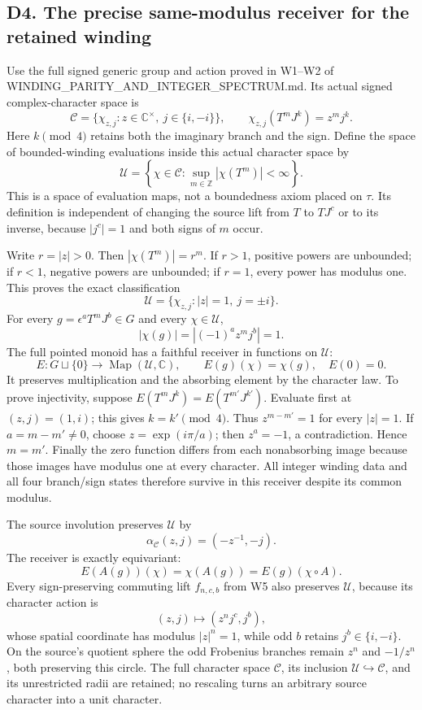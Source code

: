 \documentclass[
  11pt,
]{article}
\begin{document}
\subsection{D4. The precise same-modulus receiver for the retained
winding}\label{d4.-the-precise-same-modulus-receiver-for-the-retained-winding}

Use the full signed generic group and action proved in W1--W2 of
WINDING\_PARITY\_AND\_INTEGER\_SPECTRUM.md. Its actual signed
complex-character space is \[
\mathcal C=\{\chi_{z,j}:z\in\mathbb C^\times,\ j\in\{i,-i\}\},
\qquad
\chi_{z,j}(T^mJ^k)=z^m j^k.
\] Here \(k\pmod4\) retains both the imaginary branch and the sign.
Define the space of bounded-winding evaluations inside this actual
character space by \[
\mathcal U=\left\{\chi\in\mathcal C:\sup_{m\in\mathbb Z}|\chi(T^m)|<\infty\right\}.
\] This is a space of evaluation maps, not a boundedness axiom placed on
\(\tau\). Its definition is independent of changing the source lift from
\(T\) to \(TJ^c\) or to its inverse, because \(|j^c|=1\) and both signs
of \(m\) occur.

Write \(r=|z|>0\). Then \(|\chi(T^m)|=r^m\). If \(r>1\), positive powers
are unbounded; if \(r<1\), negative powers are unbounded; if \(r=1\),
every power has modulus one. This proves the exact classification \[
\boxed{\mathcal U=\{\chi_{z,j}:|z|=1,\ j=\pm i\}.}
\] For every \(g=\epsilon^aT^mJ^b\in G\) and every
\(\chi\in\mathcal U\), \[
|\chi(g)|=|(-1)^a z^m j^b|=1.
\] The full pointed monoid has a faithful receiver in functions on
\(\mathcal U\): \[
E:G\sqcup\{0\}\longrightarrow\operatorname{Map}(\mathcal U,\mathbb C),
\qquad E(g)(\chi)=\chi(g),\quad E(0)=0.
\] It preserves multiplication and the absorbing element by the
character law. To prove injectivity, suppose
\(E(T^mJ^k)=E(T^{m'}J^{k'})\). Evaluate first at \((z,j)=(1,i)\); this
gives \(k=k'\pmod4\). Thus \(z^{m-m'}=1\) for every \(|z|=1\). If
\(a=m-m'\ne0\), choose \(z=\exp(i\pi/a)\); then \(z^a=-1\), a
contradiction. Hence \(m=m'\). Finally the zero function differs from
each nonabsorbing image because those images have modulus one at every
character. All integer winding data and all four branch/sign states
therefore survive in this receiver despite its common modulus.

The source involution preserves \(\mathcal U\) by \[
\alpha_{\mathcal C}(z,j)=(-z^{-1},-j).
\] The receiver is exactly equivariant: \[
E(A(g))(\chi)=\chi(A(g))=E(g)(\chi\circ A).
\] Every sign-preserving commuting lift \(f_{n,c,b}\) from W5 also
preserves \(\mathcal U\), because its character action is \[
(z,j)\longmapsto(z^n j^c,j^b),
\] whose spatial coordinate has modulus \(|z|^n=1\), while odd \(b\)
retains \(j^b\in\{i,-i\}\). On the source's quotient sphere the odd
Frobenius branches remain \(z^n\) and \(-1/z^n\), both preserving this
circle. The full character space \(\mathcal C\), its inclusion
\(\mathcal U\hookrightarrow\mathcal C\), and its unrestricted radii are
retained; no rescaling turns an arbitrary source character into a unit
character.
\end{document}
